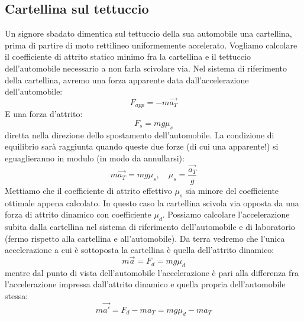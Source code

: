 \documentclass[a4paper,12pt]{article}
\begin{document}
\subsection{Cartellina sul tettuccio}
Un signore sbadato dimentica sul tettuccio della sua automobile una cartellina, prima di partire di moto rettilineo uniformemente
accelerato. Vogliamo calcolare il coefficiente di attrito statico minimo fra la cartellina e il tettuccio dell'automobile
necessario a non farla scivolare via. Nel sistema di riferimento della cartellina, avremo una forza apparente data
dall'accelerazione dell'automobile:
$$ F_{app} = -m\vec{a_T} $$
E una forza d'attrito:
$$ F_s = mg \mu_s $$
diretta nella direzione dello spostamento dell'automobile. La condizione di equilibrio sarà raggiunta quando
queste due forze (di cui una apparente!) si eguaglieranno in modulo (in modo da annullarsi):
$$ m\vec{a_T} = mg \mu_s, \quad \mu_s = \frac{\vec{a_T}}{g} $$
Mettiamo che il coefficiente di attrito effettivo $\mu_s$ sia minore del coefficiente ottimale appena calcolato. In
questo caso la cartellina scivola via opposta da una forza di attrito dinamico con coefficiente $\mu_d$. Possiamo
calcolare l'accelerazione subita dalla cartellina nel sistema di riferimento dell'automobile e di laboratorio (fermo rispetto
alla cartellina e all'automobile). Da terra vedremo che l'unica accelerazione a cui è sottoposta la cartellina
è quella dell'attrito dinamico:
$$ m\vec{a} = F_d = mg\mu_d $$
mentre dal punto di vista dell'automobile l'accelerazione è pari alla differenza fra l'accelerazione impressa dall'attrito
dinamico e quella propria dell'automobile stessa:
$$ m\vec{a'} = F_d - ma_T = mg\mu_d - ma_T $$
\end{document}
